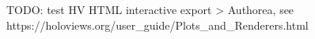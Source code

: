 TODO: test HV HTML interactive export > Authorea, see https://holoviews.org/user_guide/Plots_and_Renderers.html

